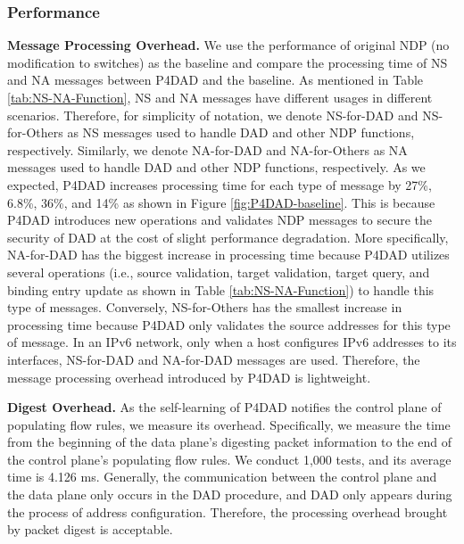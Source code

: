 \documentclass[a4paper,fleqn]{cas-dc}
\begin{document}
        \subsubsection{Performance}
            \textbf{Message Processing Overhead.} We use the performance of original NDP (no modification to switches) as the baseline and compare the processing time of NS and NA messages between P4DAD and the baseline. 
            As mentioned in Table \ref{tab:NS-NA-Function}, NS and NA messages have different usages in different scenarios. Therefore, for simplicity of notation, we denote NS-for-DAD and NS-for-Others as NS messages used to handle DAD and other NDP functions, respectively. Similarly, we denote NA-for-DAD and NA-for-Others as NA messages used to handle DAD and other NDP functions, respectively. As we expected, P4DAD increases processing time for each type of message by 27\%, 6.8\%, 36\%, and 14\% as shown in Figure \ref{fig:P4DAD-baseline}. This is because P4DAD introduces new operations and validates NDP messages to secure the security of DAD at the cost of slight performance degradation. More specifically, NA-for-DAD has the biggest increase in processing time because P4DAD utilizes several operations (i.e., source validation, target validation, target query, and binding entry update as shown in Table \ref{tab:NS-NA-Function}) to handle this type of messages. Conversely, NS-for-Others has the smallest increase in processing time because P4DAD only validates the source addresses for this type of message. In an IPv6 network, only when a host configures IPv6 addresses to its interfaces, NS-for-DAD and NA-for-DAD messages are used. Therefore, the message processing overhead introduced by P4DAD is lightweight.

            \textbf{Digest Overhead.} As the self-learning of P4DAD notifies the control plane of populating flow rules, we measure its overhead. Specifically, we measure the time from the beginning of the data plane's digesting packet information to the end of the control plane's populating flow rules. We conduct 1,000 tests, and its average time is 4.126 ms.
            Generally, the communication between the control plane and the data plane only occurs in the DAD procedure, and DAD only appears during the process of address configuration.
            Therefore, the processing overhead brought by packet digest is acceptable.

            
\end{document}
